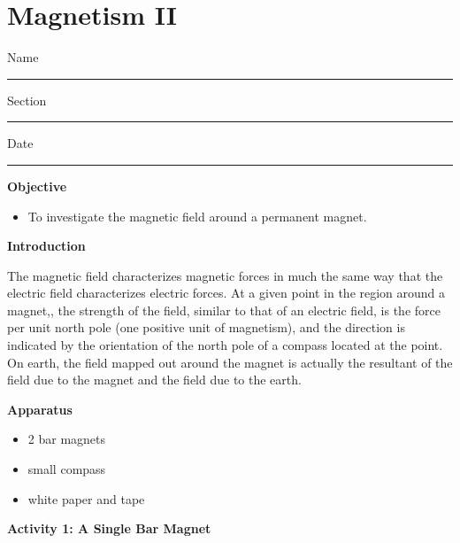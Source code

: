 
\section{Magnetism II}

Name \rule{2.0in}{0.1pt}\hfill{}Section \rule{1.0in}{0.1pt}\hfill{}Date
\rule{1.0in}{0.1pt}

\textbf{Objective}

\begin{itemize}
\item To investigate the magnetic field around a permanent magnet.
\end{itemize}
\textbf{Introduction} 

The magnetic field characterizes magnetic forces in much the same way
that the electric field characterizes electric forces.
At a given point in the region around a magnet,,
the strength of the field, similar to that of an electric field, is
the force per unit north pole (one positive unit of magnetism), and
the direction is indicated by the orientation of the north pole of
a compass located at the point. On earth, the field mapped out around
the magnet is actually the resultant of the field due to the magnet
and the field due to the earth.

\textbf{Apparatus}

\begin{itemize}
\item 2 bar magnets 
\item small compass 
\item white paper and tape
\end{itemize}
\textbf{Activity 1: A Single Bar Magnet}

\vspace{0.3cm}
{\centering {} \par}
\vspace{0.3cm}

